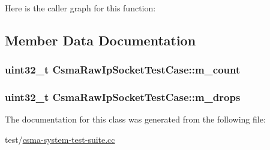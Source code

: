 Here is the caller graph for this function\+:




\subsection{Member Data Documentation}
\subsubsection[{\texorpdfstring{m\+\_\+count}{m_count}}]{\setlength{\rightskip}{0pt plus 5cm}uint32\+\_\+t Csma\+Raw\+Ip\+Socket\+Test\+Case\+::m\+\_\+count\hspace{0.3cm}{\ttfamily [private]}}\hypertarget{classCsmaRawIpSocketTestCase_adb7d408a5cd2cd0887976c23f361c14c}{}\label{classCsmaRawIpSocketTestCase_adb7d408a5cd2cd0887976c23f361c14c}
\subsubsection[{\texorpdfstring{m\+\_\+drops}{m_drops}}]{\setlength{\rightskip}{0pt plus 5cm}uint32\+\_\+t Csma\+Raw\+Ip\+Socket\+Test\+Case\+::m\+\_\+drops\hspace{0.3cm}{\ttfamily [private]}}\hypertarget{classCsmaRawIpSocketTestCase_aad20be49cfd8266edac9518693b90d20}{}\label{classCsmaRawIpSocketTestCase_aad20be49cfd8266edac9518693b90d20}


The documentation for this class was generated from the following file\+:\begin{DoxyCompactItemize}
\item 
test/\hyperlink{csma-system-test-suite_8cc}{csma-\/system-\/test-\/suite.\+cc}\end{DoxyCompactItemize}
